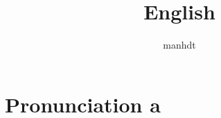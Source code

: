 \documentclass[a4paper]{article}
\begin{document}
\title{English}
\author{manhdt}
\maketitle

\section{Pronunciation a}
\end{document}
